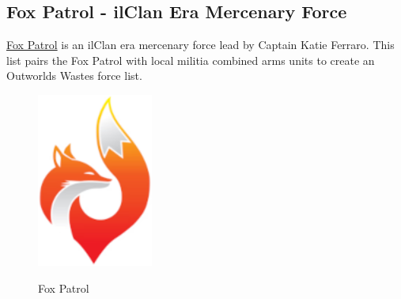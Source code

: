 \subsection{Fox Patrol - ilClan Era Mercenary Force}

\href{https://www.sarna.net/wiki/Fox_Patrol}{Fox Patrol} is an ilClan era mercenary force lead by Captain Katie Ferraro.
This list pairs the Fox Patrol with local militia combined arms units to create an Outworlds Wastes force list.

\begin{figure}[!h]
  \centering
  \includegraphics[alt='Fox Patrol Logo', width=1.5in, height=2.25in]{img/Fox-Patrol.png}
  \caption*{Fox Patrol}
\end{figure}

